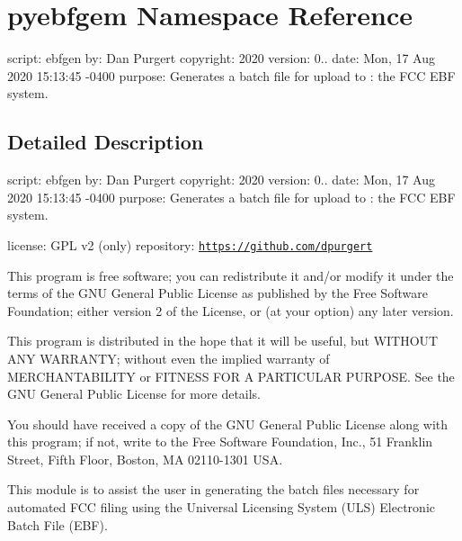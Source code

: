 \hypertarget{namespacepyebfgem}{}\section{pyebfgem Namespace Reference}
\label{namespacepyebfgem}


script\+: ebfgen by\+: Dan Purgert copyright\+: 2020 version\+: 0.. date\+: Mon, 17 Aug 2020 15\+:13\+:45 -\/0400 purpose\+: Generates a batch file for upload to \+: the F\+CC E\+BF system.  




\subsection{Detailed Description}
script\+: ebfgen by\+: Dan Purgert copyright\+: 2020 version\+: 0.. date\+: Mon, 17 Aug 2020 15\+:13\+:45 -\/0400 purpose\+: Generates a batch file for upload to \+: the F\+CC E\+BF system. 

license\+: G\+PL v2 (only) repository\+: \href{https://github.com/dpurgert}{\tt https\+://github.\+com/dpurgert}

This program is free software; you can redistribute it and/or modify it under the terms of the G\+NU General Public License as published by the Free Software Foundation; either version 2 of the License, or (at your option) any later version.

This program is distributed in the hope that it will be useful, but W\+I\+T\+H\+O\+UT A\+NY W\+A\+R\+R\+A\+N\+TY; without even the implied warranty of M\+E\+R\+C\+H\+A\+N\+T\+A\+B\+I\+L\+I\+TY or F\+I\+T\+N\+E\+SS F\+OR A P\+A\+R\+T\+I\+C\+U\+L\+AR P\+U\+R\+P\+O\+SE. See the G\+NU General Public License for more details.

You should have received a copy of the G\+NU General Public License along with this program; if not, write to the Free Software Foundation, Inc., 51 Franklin Street, Fifth Floor, Boston, MA 02110-\/1301 U\+SA.

This module is to assist the user in generating the batch files necessary for automated F\+CC filing using the Universal Licensing System (U\+LS) Electronic Batch File (E\+BF). 